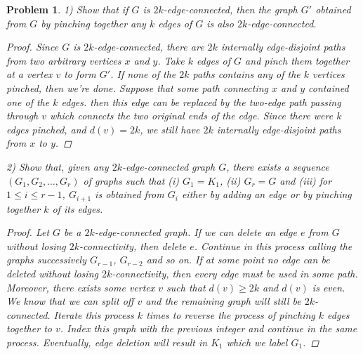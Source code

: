 \documentclass{article}
\newtheorem{problem}{Problem}
\begin{document}
\begin{problem}
1) Show that if $G$ is $2k$-edge-connected, then the graph $G'$ obtained from $G$ by pinching together any $k$ edges of $G$ is also $2k$-edge-connected.
\begin{proof}
Since $G$ is $2k$-edge-connected, there are $2k$ internally edge-disjoint paths from two arbitrary vertices $x$ and $y$. Take $k$ edges of $G$ and pinch them together at a vertex $v$ to form $G'$. If none of the $2k$ paths contains any of the $k$ vertices pinched, then we're done. Suppose that some path connecting $x$ and $y$ contained one of the $k$ edges. then this edge can be replaced by the two-edge path passing through $v$ which connects the two original ends of the edge. Since there were $k$ edges pinched, and $d(v) = 2k$, we still have $2k$ internally edge-disjoint paths from $x$ to $y$.
\end{proof}
2) Show that, given any $2k$-edge-connected graph $G$, there exists a sequence $(G_1, G_2, \dots , G_r)$ of graphs such that (i) $G_1 = K_1$, (ii) $G_r = G$ and (iii) for $1 \leq i \leq r-1$, $G_{i+1}$ is obtained from $G_i$ either by adding an edge or by pinching together $k$ of its edges.
\begin{proof}
Let $G$ be a $2k$-edge-connected graph. If we can delete an edge $e$ from $G$ without losing $2k$-connectivity, then delete $e$. Continue in this process calling the graphs successively $G_{r-1}$, $G_{r-2}$ and so on. If at some point no edge can be deleted without losing $2k$-connectivity, then every edge must be used in some path. Moreover, there exists some vertex $v$ such that $d(v) \geq 2k$ and $d(v)$ is even. We know that we can split off $v$ and the remaining graph will still be $2k$-connected. Iterate this process $k$ times to reverse the process of pinching $k$ edges together to $v$. Index this graph with the previous integer and continue in the same process. Eventually, edge deletion will result in $K_1$ which we label $G_1$.
\end{proof}
\end{problem}
\end{document}
